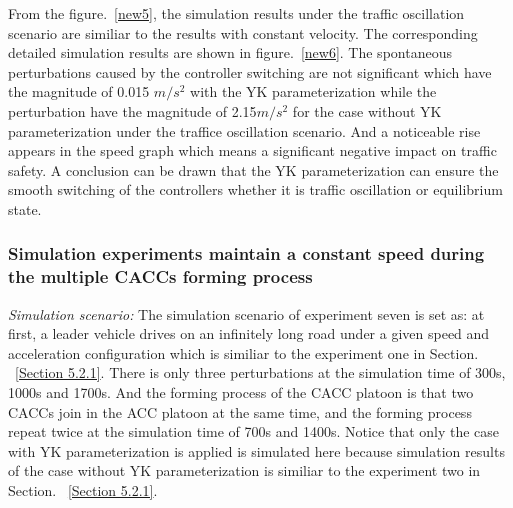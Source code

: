 \documentclass[journal]{IEEEtran}
\begin{document}
From the figure.~\ref{new5}, the simulation results under the traffic oscillation scenario are similiar to the results with constant velocity. The corresponding detailed simulation results are shown in figure.~\ref{new6}. The spontaneous perturbations caused by the controller switching are not significant which have the magnitude of 0.015 $m/s^2$ with the YK parameterization while the perturbation have the magnitude of 2.15$m/s^2$ for the case without YK parameterization under the traffice oscillation scenario. And a noticeable rise appears in the speed graph which means a significant negative impact on traffic safety. A conclusion can be drawn that the YK parameterization can ensure the smooth switching of the controllers whether it is traffic oscillation or equilibrium state.

\subsubsection{Simulation experiments maintain a constant speed during the multiple CACCs forming process}
\label{Section 5.2.3}

\textit{Simulation scenario:} The simulation scenario of experiment seven is set as: at first, a leader vehicle drives on an infinitely long road under a given speed and acceleration configuration which is similiar to the experiment one in Section. ~\ref{Section 5.2.1}. There is only three perturbations at the simulation time of 300s, 1000s and 1700s. And the forming process of the CACC platoon is that two CACCs join in the ACC platoon at the same time, and the forming process repeat twice at the simulation time of 700s and 1400s. Notice that only the case with YK parameterization is applied is simulated here because simulation results of the case without YK parameterization is similiar to the experiment two in Section. ~\ref{Section 5.2.1}.
\end{document}
